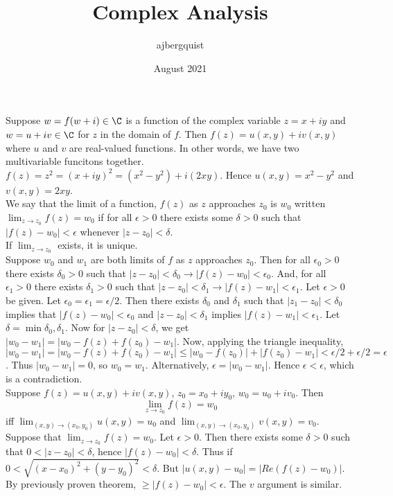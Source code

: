 \documentclass{article}
\title{Complex Analysis}
\author{ajbergquist }
\date{August 2021}
\begin{document}
 Suppose $w = f(w+i)\in\C$ is a function of the complex variable $z = x + iy$ and $w = u + iv\in \C$ for $z$ in the domain of $f$. Then $f(z) = u(x,y)+iv(x,y)$ where $u$ and $v$ are real-valued functions. In other words, we have two multivariable funcitons together.\\

 $f(z) = z^2 = (x+iy)^2 = (x^2-y^2)+i(2xy)$. Hence $u(x,y) = x^2-y^2$ and $v(x,y) = 2xy$.
\\
 We say that the limit of a function, $f(z)$ as $z$ approaches $z_0$ is $w_0$ written $ \lim_{z \to z_0} f(z) = w_0$ if for all $\epsilon > 0$ there exists some $\delta > 0$ such that $|f(z)-w_0| < \epsilon$ whenever $|z-z_0| < \delta$.\\

 If $\lim_{z\to z_0}$ exists, it is unique.\\
 Suppose $w_0$ and $w_1$ are both limits of $f$ as $z$ approaches $z_0$. Then for all $\epsilon_0 > 0$ there exists $\delta_0 > 0$ such that $|z-z_0| < \delta_0\rightarrow |f(z) - w_0| < \epsilon_0$. And, for all $\epsilon_1 > 0$ there exists $\delta_1 > 0$ such that $|z-z_0| < \delta_1\rightarrow |f(z) - w_1| < \epsilon_1$. Let $\epsilon > 0$ be given. Let $\epsilon_0 = \epsilon_1 = \epsilon/2$. Then there exists $\delta_0$ and $\delta_1$ such that $|z_1 - z_0| < \delta_0$ implies that $|f(z) - w_0|< \epsilon_0$ and $|z-z_0|<\delta_1$ implies $|f(z) - w_1| < \epsilon_1$. Let $\delta = \min{\delta_0,\delta_1}$. Now for $|z-z_0|< \delta$, we get $|w_0 - w_1| = |w_0-f(z)+ f(z_0) - w_1|$. Now, applying the triangle inequality,  $|w_0 - w_1| = |w_0-f(z)+ f(z_0) - w_1| \le |w_0-f(z_0)| + |f(z_0) - w_1| < \epsilon/2 + \epsilon/2 = \epsilon$. Thus $|w_0 - w_1| = 0$, so $w_0 = w_1.$ Alternatively, $\epsilon = |w_0 - w_1|$. Hence $\epsilon < \epsilon$, which is a contradiction. \\

 Suppose $f(z) = u(x,y) + iv(x,y)$, $z_0 = x_0 + iy_0$, $w_0= u_0+iv_0$. Then $$\lim_{z\to z_0} f(z) = w_0$$ iff
$\lim_{(x,y)\to (x_0,y_0)}u(x,y) = u_0$ and $\lim_{(x,y)\to (x_0,y_0)}v(x,y) = v_0$.\\
 Suppose that $\lim_{z\to z_0}f(z) = w_0$. Let $\epsilon > 0$. Then there exists some $\delta > 0$ such that $0<|z-z_0|<\delta$, hence $|f(z) - w_0| < \delta$. Thus if $0<\sqrt{(x-x_0)^2+(y-y_0)^2}<\delta$. But $|u(x,y)- u_0| = |Re(f(z)- w_0)|.$ By previously proven theorem, $\ge|f(z)-w_0|< \epsilon$. The $v$ argument is similar.\\
\end{document}
